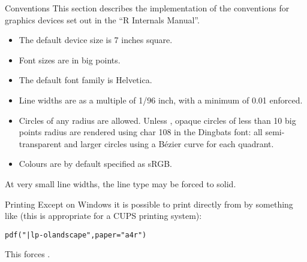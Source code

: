 %
\begin{Section}{Conventions}
This section describes the implementation of the conventions for
graphics devices set out in the ``R Internals Manual''.

\begin{itemize}

\item The default device size is 7 inches square.
\item Font sizes are in big points.
\item The default font family is Helvetica.
\item Line widths are as a multiple of 1/96 inch, with a minimum
of 0.01 enforced.
\item Circles of any radius are allowed.  Unless , opaque circles of less than 10 big points radius are
rendered using char 108 in the Dingbats font: all semi-transparent
and larger circles using a Bézier curve for each
quadrant.
\item Colours are by default specified as sRGB.

\end{itemize}


At very small line widths, the line type may be forced to solid.
\end{Section}
%
\begin{Section}{Printing}
Except on Windows it is possible to print directly from  by
something like (this is appropriate for a CUPS printing system):
\begin{alltt}
    pdf("|lp -o landscape", paper = "a4r")
\end{alltt}

This forces .
\end{Section}
%
